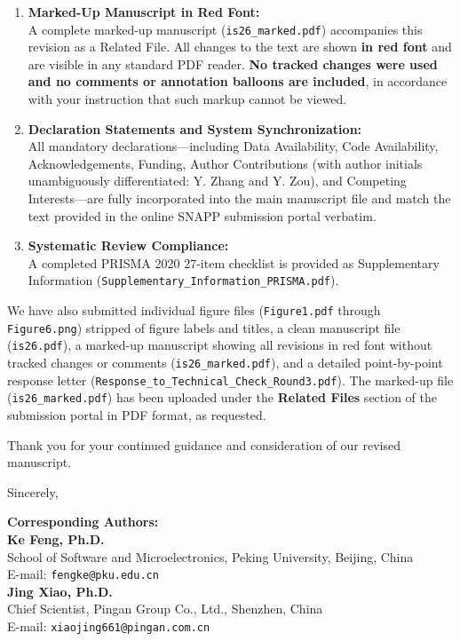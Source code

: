 \documentclass[11pt,a4paper]{article}
\begin{document}
\begin{enumerate}
    \item \textbf{Marked-Up Manuscript in Red Font:}\\
    A complete marked-up manuscript (\texttt{is26\_marked.pdf}) accompanies this revision as a Related File. All changes to the text are shown \textbf{in red font} and are visible in any standard PDF reader. \textbf{No tracked changes were used and no comments or annotation balloons are included}, in accordance with your instruction that such markup cannot be viewed.

    \item \textbf{Declaration Statements and System Synchronization:}\\
    All mandatory declarations---including Data Availability, Code Availability, Acknowledgements, Funding, Author Contributions (with author initials unambiguously differentiated: Y. Zhang and Y. Zou), and Competing Interests---are fully incorporated into the main manuscript file and match the text provided in the online SNAPP submission portal verbatim.

    \item \textbf{Systematic Review Compliance:}\\
    A completed PRISMA 2020 27-item checklist is provided as Supplementary Information (\texttt{Supplementary\_Information\_PRISMA.pdf}).
\end{enumerate}

\vspace{1em}
\noindent We have also submitted individual figure files (\texttt{Figure1.pdf} through \texttt{Figure6.png}) stripped of figure labels and titles, a clean manuscript file (\texttt{is26.pdf}), a marked-up manuscript showing all revisions in red font without tracked changes or comments (\texttt{is26\_marked.pdf}), and a detailed point-by-point response letter (\texttt{Response\_to\_Technical\_Check\_Round3.pdf}). The marked-up file (\texttt{is26\_marked.pdf}) has been uploaded under the \textbf{Related Files} section of the submission portal in PDF format, as requested.

\vspace{1.2em}
\noindent Thank you for your continued guidance and consideration of our revised manuscript.

\vspace{1.8em}
\noindent Sincerely,

\vspace{1em}
\noindent\textbf{Corresponding Authors:}\\[0.3em]
\textbf{Ke Feng, Ph.D.}\\
School of Software and Microelectronics, Peking University, Beijing, China\\
E-mail: \texttt{fengke@pku.edu.cn}\\[0.8em]
\textbf{Jing Xiao, Ph.D.}\\
Chief Scientist, Pingan Group Co., Ltd., Shenzhen, China\\
E-mail: \texttt{xiaojing661@pingan.com.cn}
\end{document}
